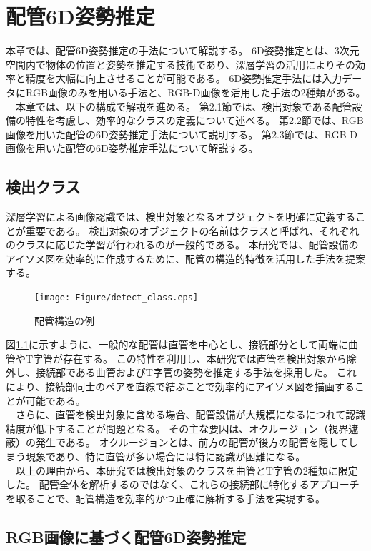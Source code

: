 \chapter{配管6D姿勢推定}
本章では、配管6D姿勢推定の手法について解説する。
6D姿勢推定とは、3次元空間内で物体の位置と姿勢を推定する技術であり、深層学習の活用によりその効率と精度を大幅に向上させることが可能である。
6D姿勢推定手法には入力データにRGB画像のみを用いる手法と、RGB-D画像を活用した手法の2種類がある。\\
　本章では、以下の構成で解説を進める。
第2.1節では、検出対象である配管設備の特性を考慮し、効率的なクラスの定義について述べる。
第2.2節では、RGB画像を用いた配管の6D姿勢推定手法について説明する。
第2.3節では、RGB-D画像を用いた配管の6D姿勢推定手法について解説する。

\section{検出クラス}
深層学習による画像認識では、検出対象となるオブジェクトを明確に定義することが重要である。
検出対象のオブジェクトの名前はクラスと呼ばれ、それぞれのクラスに応じた学習が行われるのが一般的である。
本研究では、配管設備のアイソメ図を効率的に作成するために、配管の構造的特徴を活用した手法を提案する。

\begin{figure}[htbt]
	\centering
	 \texttt{[image: Figure/detect\_class.eps]}
	 \caption{配管構造の例}
	 \label{fig:f1}
\end{figure}

図\ref{fig:f1}に示すように、一般的な配管は直管を中心とし、接続部分として両端に曲管やT字管が存在する。
この特性を利用し、本研究では直管を検出対象から除外し、接続部である曲管およびT字管の姿勢を推定する手法を採用した。
これにより、接続部同士のペアを直線で結ぶことで効率的にアイソメ図を描画することが可能である。\\
　さらに、直管を検出対象に含める場合、配管設備が大規模になるにつれて認識精度が低下することが問題となる。
その主な要因は、オクルージョン（視界遮蔽）の発生である。
オクルージョンとは、前方の配管が後方の配管を隠してしまう現象であり、特に直管が多い場合には特に認識が困難になる。\\
　以上の理由から、本研究では検出対象のクラスを曲管とT字管の2種類に限定した。
配管全体を解析するのではなく、これらの接続部に特化するアプローチを取ることで、配管構造を効率的かつ正確に解析する手法を実現する。

\section{RGB画像に基づく配管6D姿勢推定}
